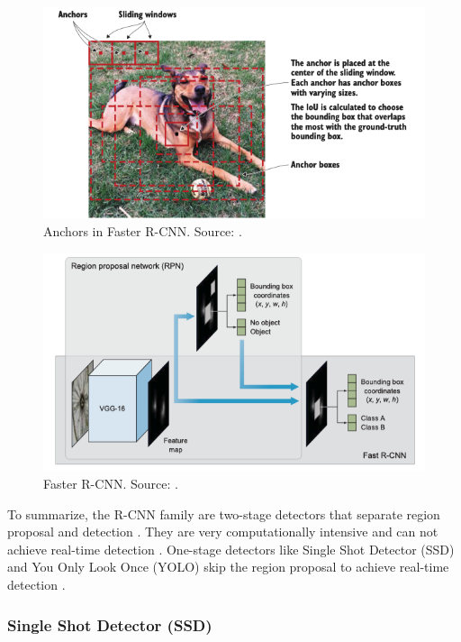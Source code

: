 \documentclass[a4paper, 11pt, oneside]{article}
\begin{document}
\begin{figure}[ht]
  \begin{center}
    \includegraphics[width=.8\textwidth]{anchors.png}
  \end{center}
  \caption{Anchors in Faster R-CNN. Source: \cite{elgendy2020deep}.}
\end{figure}

\begin{figure}[ht]
  \begin{center}
    \includegraphics[width=.8\textwidth]{faster_r_cnn.png}
  \end{center}
  \caption{Faster R-CNN. Source: \cite{elgendy2020deep}.}
\end{figure}

To summarize, the R-CNN family are two-stage detectors that separate region proposal and detection
\cite{elgendy2020deep, liu2020deep}. They are very computationally intensive and can not achieve real-time detection
\cite{elgendy2020deep, liu2016ssd, redmon2016you}. One-stage detectors like Single Shot Detector (SSD) and You
Only Look Once (YOLO) skip the region proposal to achieve real-time detection \cite{elgendy2020deep}.

\subsubsection{Single Shot Detector (SSD)}
\end{document}
